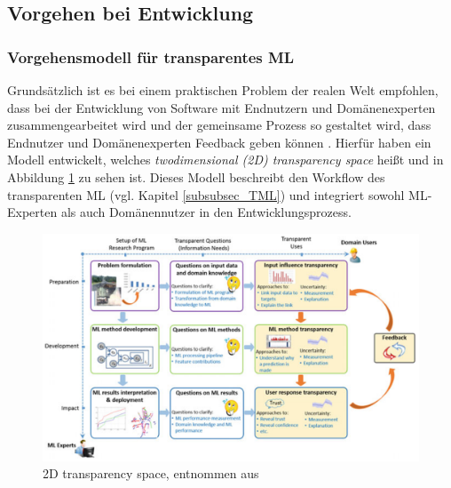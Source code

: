 \subsection{Vorgehen bei Entwicklung}
\subsubsection{Vorgehensmodell für transparentes ML}
Grundsätzlich ist es bei einem praktischen Problem der realen Welt empfohlen, dass bei der Entwicklung von Software mit Endnutzern und Domänenexperten zusammengearbeitet wird und der gemeinsame Prozess so gestaltet wird, dass Endnutzer und Domänenexperten Feedback geben können \cite{zhou20182d}. Hierfür haben \cite{zhou20182d} ein Modell entwickelt, welches \emph{twodimensional (2D) transparency space} heißt und in Abbildung \ref{Fig:2D-Transparenz} zu sehen ist. Dieses Modell beschreibt den Workflow des transparenten ML (vgl. Kapitel \ref{subsubsec_TML}) und integriert sowohl ML-Experten als auch Domänennutzer in den Entwicklungsprozess.
\begin{figure}[h]
    \centering
    \includegraphics[scale=0.55]{pic/MA-Bilder/Literaturrecherche/4-2D-TransparencyWorkflow.PNG}
    \caption{2D transparency space, entnommen aus \cite{zhou20182d}}
    \label{Fig:2D-Transparenz}
\end{figure}

